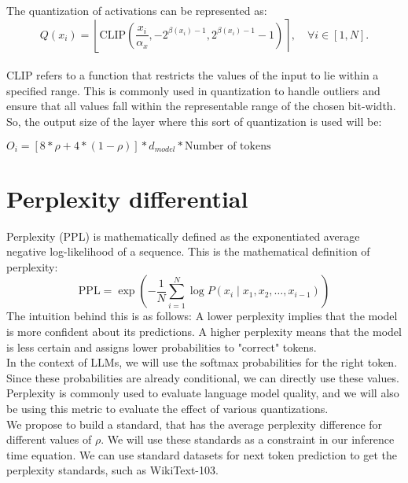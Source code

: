 \documentclass{article}
\begin{document}
The quantization of activations can be represented as:
\[
Q(x_i) = \left\lfloor \text{CLIP}\left( \frac{x_i}{\alpha_x}, -2^{\beta(x_i)-1}, 2^{\beta(x_i)-1} - 1 \right) \right\rceil, \quad \forall i \in [1, N].
\]
\\
CLIP refers to a function that restricts the values of the input to lie within a specified range. This is commonly used in quantization to handle outliers and ensure that all values fall within the representable range of the chosen bit-width. \\
So, the output size of the layer where this sort of quantization is used will be: \\
\begin{center}
$ O_i = [8 * \rho + 4 * ( 1 - \rho) ] * d_{model} * \text{Number of tokens}$
\end{center}
\section{Perplexity differential}
Perplexity (PPL) is mathematically defined as the exponentiated average negative log-likelihood of a sequence. This is the mathematical definition of perplexity:
\[
\text{PPL} = \exp\left(-\frac{1}{N} \sum_{i=1}^N \log P(x_i \mid x_1, x_2, \dots, x_{i-1})\right)
\]
The intuition behind this is as follows: A lower perplexity implies that the model is more confident about its predictions. A higher perplexity means that the model is less certain and assigns lower probabilities to "correct" tokens. \\
In the context of LLMs, we will use the softmax probabilities for the right token. Since these probabilities are already conditional, we can directly use these values. \\ 
Perplexity is commonly used to evaluate language model quality, and we will also be using this metric to evaluate the effect of various quantizations. \\
We propose to build a standard, that has the average perplexity difference for different values of $ \rho $. We will use these standards as a constraint in our inference time equation. We can use standard datasets for next token prediction to get the perplexity standards, such as WikiText-103. \\
\end{document}
